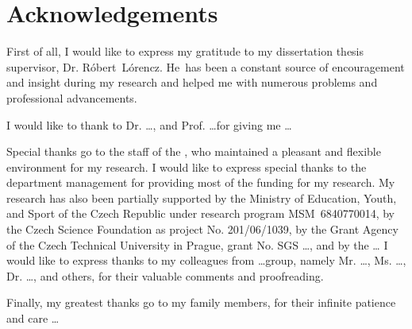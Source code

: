 \chapter*{Acknowledgements}

First of all, I would like to express my gratitude to my dissertation thesis
supervisor, Dr. R\'obert~L\'orencz. He~has been a constant source of encouragement and insight during my research and helped me with numerous problems and professional advancements.  

I would like to thank to Dr. \dots, and Prof. \dots for giving me \dots

Special thanks go to the staff of the \Department{}, who maintained a pleasant and flexible environment for my research. I would like to express special thanks to the department management for providing most of the funding for my research. 
My research has also been partially supported 
by the Ministry of Education, Youth, and Sport of the Czech Republic under research program MSM~6840770014, 
by the Czech Science Foundation as project No. 201/06/1039, 
by the Grant Agency of the Czech Technical University in Prague, grant No. SGS \dots, and
by the \dots
I would like to express thanks to my colleagues from \dots group, namely Mr. \dots, Ms. \dots, Dr. \dots, and others, for their valuable comments and proofreading.

Finally, my greatest thanks go to my family members, for their infinite patience and care \dots



